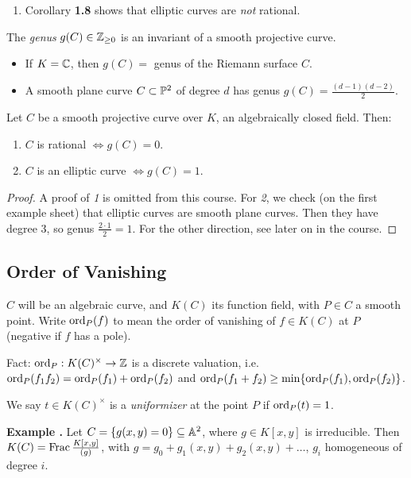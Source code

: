 \documentclass[10pt,a4paper]{article}
\begin{document}
\begin{enumerate}
  \item Corollary \textbf{1.8} shows that elliptic curves are \textit{not} rational.
\end{enumerate}

\begin{definition}
  The \emph{genus} $g(C) \in \Z_{\geq 0}$ is an invariant of a smooth projective curve.
  \begin{itemize}
    \item If $K = \C$, then $g(C) = $ genus of the Riemann surface $C$.
    \item A smooth plane curve $C \subset \P^2$ of degree $d$ has genus $g(C) = \frac{(d-1)(d-2)}{2}$.
  \end{itemize}
\end{definition}
\begin{proposition}
  Let $C$ be a smooth projective curve over $K$, an algebraically closed field. Then:
  \begin{enumerate}
    \item $C$ is rational $\iff g(C) = 0$.
    \item $C$ is an elliptic curve $\iff g(C) = 1$.
  \end{enumerate}
\end{proposition}
\begin{proof}
  A proof of \textit{1} is omitted from this course. For \textit{2}, we check (on the first example sheet) that elliptic curves are smooth plane curves. Then they have degree 3, so genus $\frac{2\cdot 1}{2} = 1$. For the other direction, see later on in the course.
\end{proof}

\subsection{Order of Vanishing}
$C$ will be an algebraic curve, and $K(C)$ its function field, with $P \in C$ a smooth point. Write $\ord_P(f)$ to mean the order of vanishing of $f \in K(C)$ at $P$ (negative if $f$ has a pole).

Fact: $\ord_P : K(C)^\times \to \Z$ is a discrete valuation, i.e. $\ord_P(f_1f_2) = \ord_P(f_1) + \ord_P(f_2)$ and $\ord_P(f_1+f_2) \geq \min \{\ord_P(f_1), \ord_P(f_2)\}$.

We say $t \in K(C)^\times$ is a \emph{uniformizer} at the point $P$ if $\ord_P(t) = 1$.

\textbf{Example \thetheorem.} Let $C = \{g(x,y) = 0\}\subseteq \A^2$, where $g \in K[x,y]$ is irreducible. Then $K(C) = \Frac \frac{K[x,y]}{(g)}$, with $g = g_0 + g_1(x,y) + g_2(x,y) + \ldots$, $g_i$ homogeneous of degree $i$.
\end{document}
